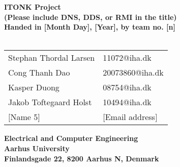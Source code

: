 \begin{titlepage}
\begin{center}
{\LARGE \textbf{ITONK Project}}\\
{\large \textbf{(Please include DNS, DDS, or RMI in the title)}}\\
\textbf{Handed in [Month Day], [Year], by team no. [n]}\\~\\
\begin{tabular}{ll}
Stephan Thordal Larsen  & 11072@iha.dk \\
Cong Thanh Dao & 20073860@iha.dk \\
Kasper Duong & 08754@iha.dk \\
Jakob Toftegaard Holst  & 10494@iha.dk \\
$[$Name 5$]$  & $[$Email address$]$ \\
\end{tabular}
\vfill
\textbf{Electrical and Computer Engineering}\\
\textbf{Aarhus University}\\
\textbf{Finlandsgade 22, 8200 Aarhus N, Denmark}
\end{center}
\end{titlepage}